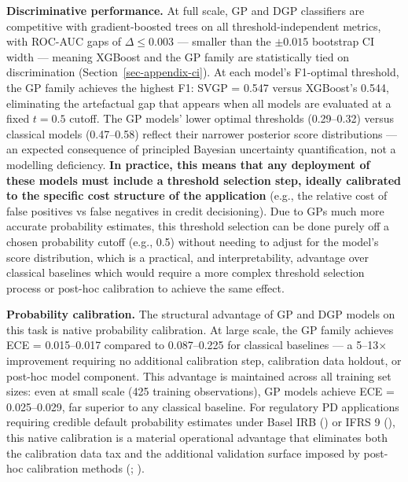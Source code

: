 \documentclass[
  letterpaper,
  DIV=11,
  numbers=noendperiod]{scrartcl}
\begin{document}
\textbf{Discriminative performance.} At full scale, GP and DGP
classifiers are competitive with gradient-boosted trees on all
threshold-independent metrics, with ROC-AUC gaps of
\(\Delta \leq 0.003\) --- smaller than the \(\pm 0.015\) bootstrap CI
width --- meaning XGBoost and the GP family are statistically tied on
discrimination (Section~\ref{sec-appendix-ci}). At each model's
F1-optimal threshold, the GP family achieves the highest F1: SVGP =
0.547 versus XGBoost's 0.544, eliminating the artefactual gap that
appears when all models are evaluated at a fixed \(t = 0.5\) cutoff. The
GP models' lower optimal thresholds (0.29--0.32) versus classical models
(0.47--0.58) reflect their narrower posterior score distributions --- an
expected consequence of principled Bayesian uncertainty quantification,
not a modelling deficiency. \textbf{In practice, this means that any
deployment of these models must include a threshold selection step,
ideally calibrated to the specific cost structure of the application}
(e.g., the relative cost of false positives vs false negatives in credit
decisioning). Due to GPs much more accurate probability estimates, this
threshold selection can be done purely off a chosen probability cutoff
(e.g., 0.5) without needing to adjust for the model's score
distribution, which is a practical, and interpretability, advantage over
classical baselines which would require a more complex threshold
selection process or post-hoc calibration to achieve the same effect.

\textbf{Probability calibration.} The structural advantage of GP and DGP
models on this task is native probability calibration. At large scale,
the GP family achieves ECE = 0.015--0.017 compared to 0.087--0.225 for
classical baselines --- a 5--13\(\times\) improvement requiring no
additional calibration step, calibration data holdout, or post-hoc model
component. This advantage is maintained across all training set sizes:
even at small scale (425 training observations), GP models achieve ECE =
0.025--0.029, far superior to any classical baseline. For regulatory PD
applications requiring credible default probability estimates under
Basel IRB () or IFRS 9 (), this native calibration is a material
operational advantage that eliminates both the calibration data tax and
the additional validation surface imposed by post-hoc calibration
methods (;
).
\end{document}
